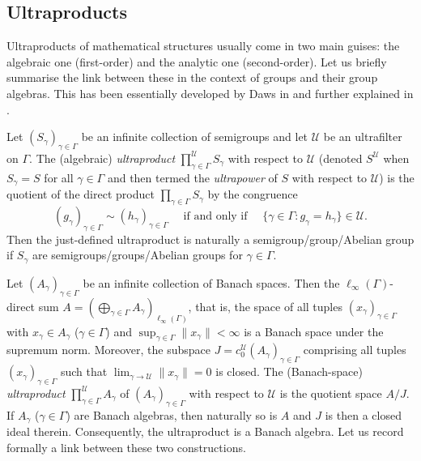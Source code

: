 \documentclass[12pt,fleqn]{amsart}
\theoremstyle{definition}
\numberwithin{equation}{section}
\theoremstyle{remark}
\begin{document}
\subsection{Ultraproducts} Ultraproducts of mathematical structures usually come in two main guises: the algebraic one (first-order) and the analytic one (second-order). Let us briefly summarise the link between these in the context of groups and their group algebras. This has been essentially developed by Daws in \cite[Section 5.4]{daws2009amenability} and further explained in \cite[Section 2.3.2]{DraKa}.\smallskip

Let $(S_\gamma)_{\gamma\in \Gamma}$ be an infinite collection of semigroups and let $\mathscr U$ be an ultrafilter on $\Gamma$. The (algebraic) \emph{ultraproduct} $\prod_{\gamma\in \Gamma}^{\mathscr{U}}S_\gamma$ with respect to $\mathscr{U}$ (denoted $S^{\mathscr U}$ when $S_\gamma=S$ for all $\gamma\in \Gamma$ and then termed the \emph{ultrapower} of $S$ with respect to $\mathscr{U}$) is the quotient of the direct product $\prod_{\gamma\in \Gamma}S_\gamma$ by the congruence 
\[
    (g_\gamma)_{\gamma\in \Gamma} \sim (h_\gamma)_{\gamma\in \Gamma}\quad\text{ if and only if }\quad\{\gamma\in \Gamma\colon g_\gamma = h_\gamma\}\in \mathscr{U}.
\]
%
Then the just-defined ultraproduct is naturally a semigroup/group/Abelian group if $S_\gamma$ are semigroups/groups/Abelian groups for $\gamma\in \Gamma$.\smallskip

Let $(A_\gamma)_{\gamma\in \Gamma}$ be an infinite collection of Banach spaces. Then the $\ell_\infty(\Gamma)$-direct sum $A = ( \bigoplus_{\gamma\in \Gamma} A_\gamma)_{\ell_\infty(\Gamma)}$, that is, the space of all tuples $(x_\gamma)_{\gamma\in \Gamma}$ with $x_\gamma\in A_\gamma$ ($\gamma\in \Gamma$) and $\sup_{\gamma\in \Gamma}\|x_\gamma\|<\infty$ is a Banach space under the supremum norm. Moreover, the subspace $J=c_0^{\mathscr U}(A_\gamma)_{\gamma\in \Gamma}$ comprising all tuples $(x_\gamma)_{\gamma\in \Gamma}$ such that $\lim_{\gamma\to \mathscr{U}}\|x_\gamma\|=0$ is closed. The (Banach-space) \emph{ultraproduct} $\prod_{\gamma\in \Gamma}^{\mathscr U}A_\gamma$ of $(A_\gamma)_{\gamma\in \Gamma}$ with respect to $\mathscr{U}$ is the quotient space $A / J$. If $A_\gamma$ ($\gamma\in \Gamma$) are Banach algebras, then naturally so is $A$ and $J$ is then a closed ideal therein. Consequently, the ultraproduct is a Banach algebra. Let us record formally a link between these two constructions.
\end{document}
